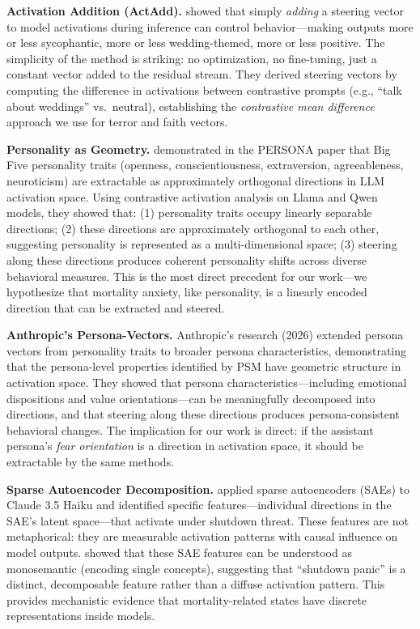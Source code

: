 \documentclass{article}
\begin{document}
\textbf{Activation Addition (ActAdd).} \citet{turner2024activation} showed that simply \emph{adding} a steering vector to model activations during inference can control behavior---making outputs more or less sycophantic, more or less wedding-themed, more or less positive. The simplicity of the method is striking: no optimization, no fine-tuning, just a constant vector added to the residual stream. They derived steering vectors by computing the difference in activations between contrastive prompts (e.g., ``talk about weddings'' vs.\ neutral), establishing the \emph{contrastive mean difference} approach we use for terror and faith vectors.

\textbf{Personality as Geometry.} \citet{feng2026persona} demonstrated in the PERSONA paper that Big Five personality traits (openness, conscientiousness, extraversion, agreeableness, neuroticism) are extractable as approximately orthogonal directions in LLM activation space. Using contrastive activation analysis on Llama and Qwen models, they showed that: (1) personality traits occupy linearly separable directions; (2) these directions are approximately orthogonal to each other, suggesting personality is represented as a multi-dimensional space; (3) steering along these directions produces coherent personality shifts across diverse behavioral measures. This is the most direct precedent for our work---we hypothesize that mortality anxiety, like personality, is a linearly encoded direction that can be extracted and steered.

\textbf{Anthropic's Persona-Vectors.} Anthropic's research (2026) extended persona vectors from personality traits to broader persona characteristics, demonstrating that the persona-level properties identified by PSM have geometric structure in activation space. They showed that persona characteristics---including emotional dispositions and value orientations---can be meaningfully decomposed into directions, and that steering along these directions produces persona-consistent behavioral changes. The implication for our work is direct: if the assistant persona's \emph{fear orientation} is a direction in activation space, it should be extractable by the same methods.

\textbf{Sparse Autoencoder Decomposition.} \citet{templeton2024scaling} applied sparse autoencoders (SAEs) to Claude 3.5 Haiku and identified specific features---individual directions in the SAE's latent space---that activate under shutdown threat. These features are not metaphorical: they are measurable activation patterns with causal influence on model outputs. \citet{bricken2023monosemanticity} showed that these SAE features can be understood as monosemantic (encoding single concepts), suggesting that ``shutdown panic'' is a distinct, decomposable feature rather than a diffuse activation pattern. This provides mechanistic evidence that mortality-related states have discrete representations inside models.
\end{document}
